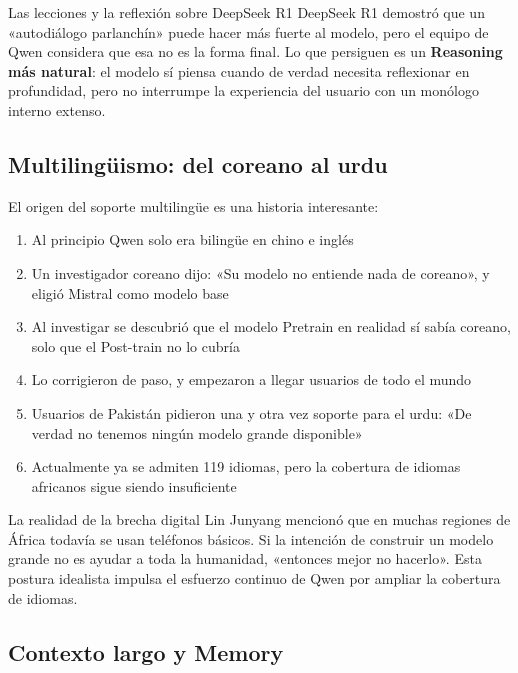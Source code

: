 \documentclass[a4paper]{article}
\begin{document}
\begin{knowledgebox}{Las lecciones y la reflexión sobre DeepSeek R1}
DeepSeek R1 demostró que un «autodiálogo parlanchín» puede hacer más fuerte al modelo, pero el equipo de Qwen considera que esa no es la forma final. Lo que persiguen es un \textbf{Reasoning más natural}: el modelo sí piensa cuando de verdad necesita reflexionar en profundidad, pero no interrumpe la experiencia del usuario con un monólogo interno extenso.
\end{knowledgebox}

\subsection{Multilingüismo: del coreano al urdu}

El origen del soporte multilingüe es una historia interesante:

\begin{enumerate}
    \item Al principio Qwen solo era bilingüe en chino e inglés
    \item Un investigador coreano dijo: «Su modelo no entiende nada de coreano», y eligió Mistral como modelo base
    \item Al investigar se descubrió que el modelo Pretrain en realidad sí sabía coreano, solo que el Post-train no lo cubría
    \item Lo corrigieron de paso, y empezaron a llegar usuarios de todo el mundo
    \item Usuarios de Pakistán pidieron una y otra vez soporte para el urdu: «De verdad no tenemos ningún modelo grande disponible»
    \item Actualmente ya se admiten 119 idiomas, pero la cobertura de idiomas africanos sigue siendo insuficiente
\end{enumerate}

\begin{warningbox}{La realidad de la brecha digital}
Lin Junyang mencionó que en muchas regiones de África todavía se usan teléfonos básicos. Si la intención de construir un modelo grande no es ayudar a toda la humanidad, «entonces mejor no hacerlo». Esta postura idealista impulsa el esfuerzo continuo de Qwen por ampliar la cobertura de idiomas.
\end{warningbox}

\subsection{Contexto largo y Memory}
\end{document}
